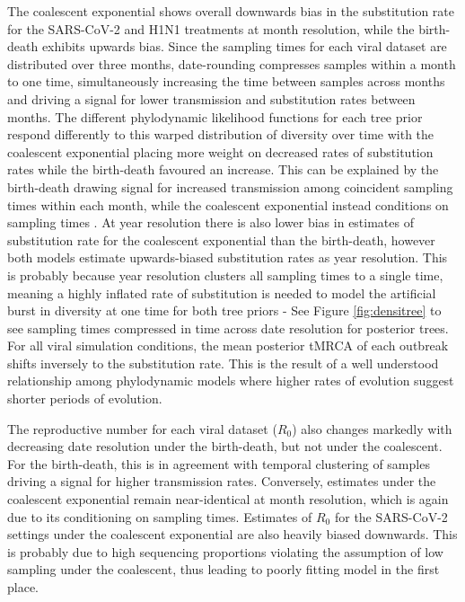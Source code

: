 \documentclass[12pt]{article}
\begin{document}
\begin{spacing}{2}
The coalescent exponential shows overall downwards bias in the substitution rate for the SARS-CoV-2 and H1N1 treatments at month resolution, while the birth-death exhibits upwards bias. Since the sampling times for each viral dataset are distributed over three months, date-rounding compresses samples within a month to one time, simultaneously increasing the time between samples across months and driving a signal for lower transmission and substitution rates between months. The different phylodynamic likelihood functions for each tree prior respond differently to this warped distribution of diversity over time with the coalescent exponential placing more weight on decreased rates of substitution rates while the birth-death favoured an increase. This can be explained by the birth-death drawing signal for increased transmission among coincident sampling times within each month, while the coalescent exponential instead conditions on sampling times \citep{volz_sampling_2014}. At year resolution there is also lower bias in estimates of substitution rate for the coalescent exponential than the birth-death, however both models estimate upwards-biased substitution rates as year resolution. This is probably because year resolution clusters all sampling times to a single time, meaning a highly inflated rate of substitution is needed to model the artificial burst in diversity at one time for both tree priors - See Figure \ref{fig:densitree} to see sampling times compressed in time across date resolution for posterior trees. For all viral simulation conditions, the mean posterior tMRCA of each outbreak shifts inversely to the substitution rate. This is the result of a well understood relationship among phylodynamic models where higher rates of evolution suggest shorter periods of evolution.

The reproductive number for each viral dataset ($R_0$) also changes markedly with decreasing date resolution under the birth-death, but not under the coalescent. For the birth-death, this is in agreement with temporal clustering of samples driving a signal for higher transmission rates. Conversely, estimates under the coalescent exponential remain near-identical at month resolution, which is again due to its conditioning on sampling times. Estimates of $R_0$ for the SARS-CoV-2 settings under the coalescent exponential are also heavily biased downwards. This is probably due to high sequencing proportions violating the assumption of low sampling under the coalescent, thus leading to poorly fitting model in the first place.


\end{spacing}
\end{document}
